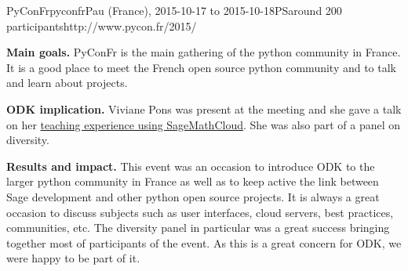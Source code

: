 \begin{event}{PyConFr}{pyconfr}{Pau (France), 2015-10-17 to 2015-10-18}{PS}{around 200 participants}{http://www.pycon.fr/2015/}

\textbf{Main goals.} PyConFr is the main gathering of the python community in France. It is a good place to meet the 
French open source python community and to talk and learn about projects.

\textbf{ODK implication.} Viviane Pons was present at the meeting and she gave a talk
on her \href{http://www.pycon.fr/2015/schedule/presentation/16/}{teaching experience using SageMathCloud}. She was
also part of a panel on diversity. 

\textbf{Results and impact.} This event was an occasion to introduce ODK to the larger python community in France as well as to
keep active the link between Sage development and other python open source projects. It is always a great occasion to discuss subjects
 such as user interfaces, cloud servers, best practices, communities, etc. The diversity panel in particular was a great success bringing
 together most of participants of the event. As this is a great concern for ODK, we were happy to be part of it.


\end{event}